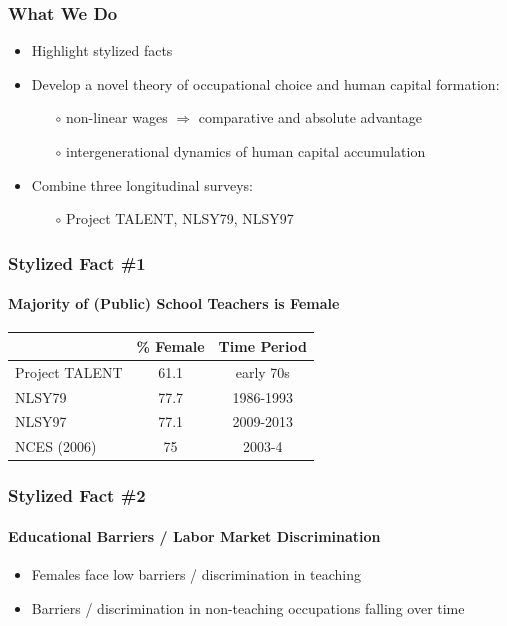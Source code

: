 \documentclass[11pt]{beamer}
\begin{document}
	\begin{frame}
		\frametitle{What We Do}
		\vfill
		\begin{itemize}
			\item Highlight stylized facts
			\vfill
			\item Develop a novel theory of occupational choice and human capital formation: 
			\begin{itemize}
				\item[$\circ$] non-linear wages $\Rightarrow$ comparative and absolute advantage
				\item[$\circ$] intergenerational dynamics of human capital accumulation
			\end{itemize}
			\vfill
			\item Combine three longitudinal surveys: 
			\begin{itemize}
				\item[$\circ$] Project TALENT, NLSY79, NLSY97
			\end{itemize}
		\end{itemize}
		\vfill
	\end{frame}
	
	\begin{frame}
		\frametitle{Stylized Fact \#1}
		\framesubtitle{Majority of (Public) School Teachers is Female}
		\begin{table}[h!]
			\centering 
			\begin{tabular}{l c c }
				\toprule
				& \% Female & Time Period \\
				\midrule
				Project TALENT  &  61.1 & early 70s \\
				NLSY79  & 77.7 & 1986-1993 \\
				NLSY97  & 77.1 & 2009-2013 \\
				\midrule
				NCES (2006) & 75 & 2003-4\\
				\bottomrule
			\end{tabular}
		\end{table}
	\end{frame}
	
	\begin{frame}
		\frametitle{Stylized Fact \#2}
		\framesubtitle{Educational Barriers / Labor Market Discrimination}
		\begin{itemize}
			\item Females face low barriers / discrimination in teaching
			\item Barriers / discrimination in non-teaching occupations falling over time
		\end{itemize}
	\end{frame}
	
\end{document}

